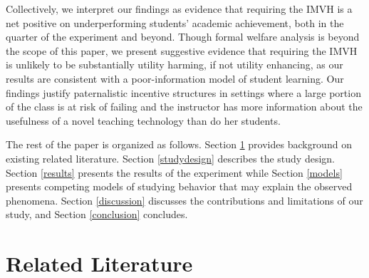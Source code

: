 \documentclass[12pt]{article}
\begin{document}
Collectively, we interpret our findings as evidence that requiring the IMVH is a net positive on underperforming students' academic achievement, both in the quarter of the experiment and beyond. Though formal welfare analysis is beyond the scope of this paper, we present suggestive evidence that requiring the IMVH is unlikely to be substantially utility harming, if not utility enhancing, as our results are consistent with a poor-information model of student learning. Our findings justify paternalistic incentive structures in settings where a large portion of the class is at risk of failing and the instructor has more information about the usefulness of a novel teaching technology than do her students.


The rest of the paper is organized as follows. Section \ref{background} provides background on existing related literature. Section \ref{studydesign} describes the study design. Section \ref{results} presents the results of the experiment while Section \ref{models} presents competing models of studying behavior that may explain the observed phenomena. Section \ref{discussion} discusses the contributions and limitations of our study, and Section \ref{conclusion} concludes.


\section{Related Literature} \label{background}
\end{document}
